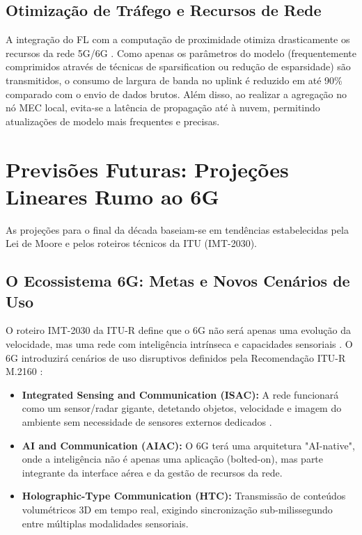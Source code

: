 \documentclass[runningheads]{llncs}
\begin{document}
\subsection{Otimização de Tráfego e Recursos de Rede}
A integração do FL com a computação de proximidade otimiza drasticamente os recursos da rede 5G/6G \cite{pmc2022}. Como apenas os parâmetros do modelo (frequentemente comprimidos através de técnicas de sparsification ou redução de esparsidade) são transmitidos, o consumo de largura de banda no uplink é reduzido em até 90\% comparado com o envio de dados brutos. Além disso, ao realizar a agregação no nó MEC local, evita-se a latência de propagação até à nuvem, permitindo atualizações de modelo mais frequentes e precisas.

\section{Previsões Futuras: Projeções Lineares Rumo ao 6G}
As projeções para o final da década baseiam-se em tendências estabelecidas pela Lei de Moore e pelos roteiros técnicos da ITU (IMT-2030).

\subsection{O Ecossistema 6G: Metas e Novos Cenários de Uso}
O roteiro IMT-2030 da ITU-R define que o 6G não será apenas uma evolução da velocidade, mas uma rede com inteligência intrínseca e capacidades sensoriais \cite{itu2026}.
O 6G introduzirá cenários de uso disruptivos definidos pela Recomendação ITU-R M.2160 \cite{itu2026}: 

\begin{itemize}
    \item \textbf{Integrated Sensing and Communication (ISAC):} A rede funcionará como um sensor/radar gigante, detetando objetos, velocidade e imagem do ambiente sem necessidade de sensores externos dedicados \cite{eand2025}.
    \item \textbf{AI and Communication (AIAC):} O 6G terá uma arquitetura "AI-native", onde a inteligência não é apenas uma aplicação (bolted-on), mas parte integrante da interface aérea e da gestão de recursos da rede.
    \item \textbf{Holographic-Type Communication (HTC):} Transmissão de conteúdos volumétricos 3D em tempo real, exigindo sincronização sub-milissegundo entre múltiplas modalidades sensoriais.
\end{itemize}
\end{document}
